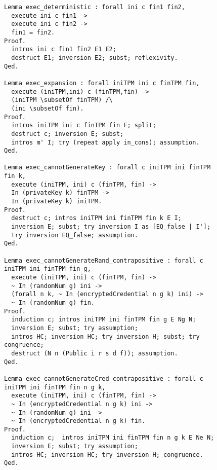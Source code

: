\begin{figure}[h]
\begin{lstlisting}[language=Coq]
Lemma exec_deterministic : forall ini c fin1 fin2,
  execute ini c fin1 ->
  execute ini c fin2 ->
  fin1 = fin2.
Proof.
  intros ini c fin1 fin2 E1 E2;
  destruct E1; inversion E2; subst; reflexivity.
Qed.

Lemma exec_expansion : forall iniTPM ini c finTPM fin,
  execute (iniTPM,ini) c (finTPM,fin) ->
  (iniTPM \subsetOf finTPM) /\
  (ini \subsetOf fin).
Proof.
  intros iniTPM ini c finTPM fin E; split;
  destruct c; inversion E; subst; 
  intros m' I; try (repeat apply in_cons); assumption.
Qed.

Lemma exec_cannotGenerateKey : forall c iniTPM ini finTPM fin k,
  execute (iniTPM, ini) c (finTPM, fin) ->
  In (privateKey k) finTPM ->
  In (privateKey k) iniTPM.
Proof.
  destruct c; intros iniTPM ini finTPM fin k E I;
  inversion E; subst; try inversion I as [EQ_false | I']; 
  try inversion EQ_false; assumption.
Qed.

Lemma exec_cannotGenerateRand_contrapositive : forall c iniTPM ini finTPM fin g,
  execute (iniTPM, ini) c (finTPM, fin) ->
  ~ In (randomNum g) ini ->
  (forall n k, ~ In (encryptedCredential n g k) ini) ->
  ~ In (randomNum g) fin.
Proof.
  induction c; intros iniTPM ini finTPM fin g E Ng N;
  inversion E; subst; try assumption;
  intros HC; inversion HC; try inversion H; subst; try congruence;
  destruct (N n (Public i r s d f)); assumption.
Qed.

Lemma exec_cannotGenerateCred_contrapositive : forall c iniTPM ini finTPM fin n g k,
  execute (iniTPM, ini) c (finTPM, fin) ->
  ~ In (encryptedCredential n g k) ini ->
  ~ In (randomNum g) ini ->
  ~ In (encryptedCredential n g k) fin.
Proof.
  induction c;  intros iniTPM ini finTPM fin n g k E Ne N;
  inversion E; subst; try assumption;
  intros HC; inversion HC; try inversion H; congruence.
Qed.
\end{lstlisting}
\end{figure}   
 